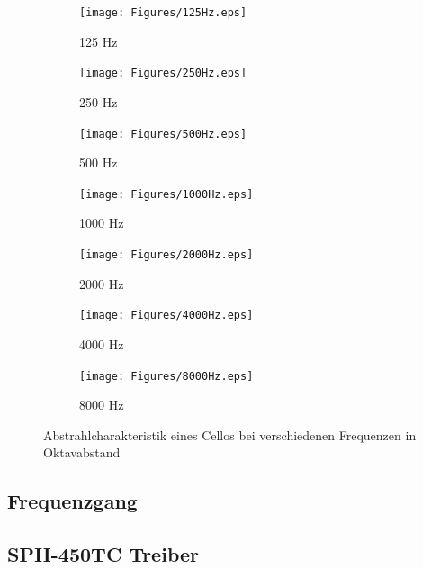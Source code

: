 \begin{figure}[bth]
    \centering
    \begin{subfigure}{.5\textwidth}
        \centering
        \caption{125 Hz}
        \texttt{[image: Figures/125Hz.eps]}
    \end{subfigure}%
    \begin{subfigure}{.5\textwidth}
        \centering
        \caption{250 Hz}
        \texttt{[image: Figures/250Hz.eps]}
    \end{subfigure}

    \vspace{0.5cm}
    \begin{subfigure}{.5\textwidth}
        \centering
        \caption{500 Hz}
        \texttt{[image: Figures/500Hz.eps]}
    \end{subfigure}%
    \begin{subfigure}{.5\textwidth}
        \centering
        \caption{1000 Hz}
        \texttt{[image: Figures/1000Hz.eps]}
    \end{subfigure}

    \vspace{0.5cm}
    \begin{subfigure}{.5\textwidth}
        \centering
        \caption{2000 Hz}
        \texttt{[image: Figures/2000Hz.eps]}
    \end{subfigure}%
    \begin{subfigure}{.5\textwidth}
        \centering
        \caption{4000 Hz}
        \texttt{[image: Figures/4000Hz.eps]}
    \end{subfigure}

    \vspace{0.5cm}
    \begin{subfigure}{.5\textwidth}
        \centering
        \caption{8000 Hz}
        \texttt{[image: Figures/8000Hz.eps]}
    \end{subfigure}

    \caption{Abstrahlcharakteristik eines Cellos bei verschiedenen Frequenzen in Oktavabstand}
    \label{fig:balloon}
\end{figure}


\subsection{Frequenzgang}
\label{subsec:b}
\blindtext


\subsection{SPH-450TC Treiber}
\label{subsec:c}

